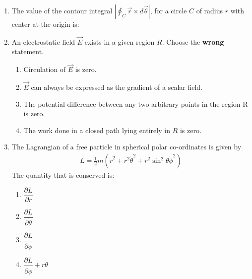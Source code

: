 \documentclass[14pt, a4paper]{extarticle}
\begin{document}
\begin{enumerate}[label=\textbf{Q. \arabic*}]

\item The value of the contour integral
    $ \left| \oint_C \vec{r} \times d\vec{\theta} \right| $,
    for a circle $C$ of radius $r$ with center at the origin is:
    \begin{enumerate}[label=(\Alph*)]
    \end{enumerate}

\item An electrostatic field $\vec{E}$ exists in a given region $R$. Choose the \textbf{wrong} statement.
   
    \begin{enumerate}[label=(\Alph*)]
        \item Circulation of $\vec{E}$ is zero.
        \item $\vec{E}$ can always be expressed as the gradient of a scalar field.
        \item The potential difference between any two arbitrary points in the region R is zero.
        \item The work done in a closed path lying entirely in $R$ is zero.   
    \end{enumerate}


\item The Lagrangian of a free particle in spherical polar co-ordinates is given by
    \begin{align*}
    L = \frac{1}{2}m(\dot{r}^2 + r^2\dot{\theta}^2 + r^2\sin^2\theta\dot{\phi}^2)
    \end{align*}
    The quantity that is conserved is:
    \begin{multicols}{2}
    \begin{enumerate}[label=(\Alph*)]
        \item $\dfrac{\partial L}{\partial \dot{r}}$
        \item $\dfrac{\partial L}{\partial \dot{\theta}}$
        \item $\dfrac{\partial L}{\partial \dot{\phi}}$
        \item $\dfrac{\partial L}{\partial \dot{\phi}} + r \dot{\theta}$
    \end{enumerate}
    \end{multicols}


\end{enumerate}
\end{document}
